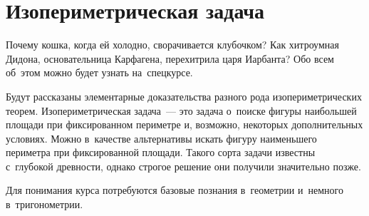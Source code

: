 
\section*{Изопериметрическая задача}



Почему кошка, когда ей холодно, сворачивается клубочком?
Как хитроумная Дидона, основательница Карфагена, перехитрила царя Иарбанта?
Обо всем об~этом можно будет узнать на~спецкурсе.

Будут рассказаны элементарные доказательства разного рода изопериметрических
теорем.
Изопериметрическая задача~--- это задача о~поиске фигуры наибольшей площади при
фиксированном периметре и, возможно, некоторых дополнительных условиях.
Можно в~качестве альтернативы искать фигуру наименьшего периметра при
фиксированной площади.
Такого сорта задачи известны с~глубокой древности, однако строгое решение они
получили значительно позже.

Для понимания курса потребуются базовые познания в~геометрии и~немного
в~тригонометрии.


